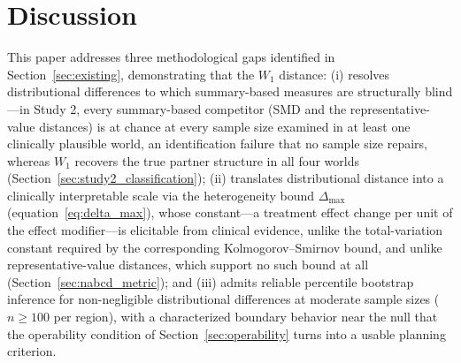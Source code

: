 \documentclass[AMA,Times1COL]{WileyNJDv5}
\begin{document}
\section{Discussion}\label{sec:discussion}

This paper addresses three methodological gaps identified in Section~\ref{sec:existing}, demonstrating that the $W_1$ distance: (i) resolves distributional differences to which summary-based measures are structurally blind---in Study 2, every summary-based competitor (SMD and the representative-value distances) is at chance at every sample size examined in at least one clinically plausible world, an identification failure that no sample size repairs, whereas $W_1$ recovers the true partner structure in all four worlds (Section~\ref{sec:study2_classification}); (ii) translates distributional distance into a clinically interpretable scale via the heterogeneity bound \(\Delta_{\max}\) (equation~\ref{eq:delta_max}), whose constant---a treatment effect change per unit of the effect modifier---is elicitable from clinical evidence, unlike the total-variation constant required by the corresponding Kolmogorov--Smirnov bound, and unlike representative-value distances, which support no such bound at all (Section~\ref{sec:nabcd_metric});\cite{komiyama2024} and (iii) admits reliable percentile bootstrap inference for non-negligible distributional differences at moderate sample sizes (\(n \geq 100\) per region), with a characterized boundary behavior near the null that the operability condition of Section~\ref{sec:operability} turns into a usable planning criterion.
\end{document}
